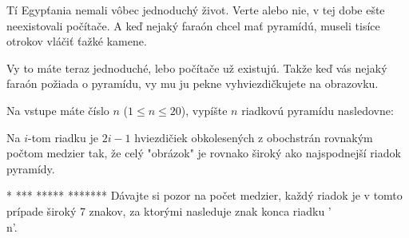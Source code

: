 




Tí Egypťania nemali vôbec jednoduchý život. Verte alebo nie, 
v tej dobe ešte neexistovali počítače. A keď nejaký faraón chcel mať pyramídú, 
museli tisíce otrokov vláčiť ťažké kamene.

Vy to máte teraz jednoduché, lebo počítače už existujú.
Takže keď vás nejaký faraón požiada o pyramídu, vy mu ju pekne vyhviezdičkujete na obrazovku.


Na vstupe máte číslo $n$ ($1\leq n\leq 20$), vypíšte $n$ riadkovú pyramídu nasledovne:

Na $i$-tom riadku je $2i-1$ hviezdičiek obkolesených z obochstrán rovnakým počtom medzier tak,
že celý "obrázok" je rovnako široký ako najspodnejší riadok pyramídy.



\vystup
   *   %
  ***  %
 ***** %
*******%
\komentar
Dávajte si pozor na počet medzier, každý riadok je v tomto
prípade široký 7 znakov, za ktorými nasleduje znak konca riadku '\\n'.
\koniec


